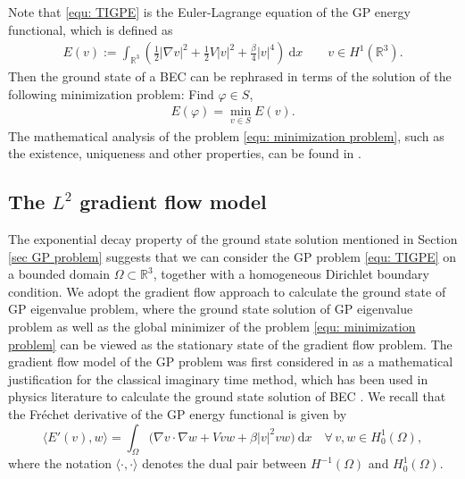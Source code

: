 \documentclass{siamart250211}
\def\R{\mathbb{R}}
\begin{document}
Note that \eqref{equ: TIGPE} is the Euler-Lagrange equation of the GP energy functional, which is defined as
\begin{align}
    E(v):= \int_{\R^3} \left ( \frac12 |\nabla v|^2 + \frac12 V |v|^2 + \frac{\beta}{4} |v|^4  \right ) \ \text{d}x \qquad v \in H^1(\R^3).
\end{align}
Then the ground state of a BEC can be rephrased in terms of the solution of the following minimization problem: Find $\varphi \in S$,
\begin{align}\label{equ: minimization problem}
    E(\varphi) = \min_{v \in S} E(v).
\end{align}
The mathematical analysis of the problem \eqref{equ: minimization problem}, such as the existence, uniqueness and other properties, can be found in \cite{bao2013mathematical,cances2010numerical}.

\subsection{The \texorpdfstring{{\boldmath $L^2$}}{L2} gradient flow model}

The exponential decay property of the ground state solution mentioned in Section \ref{sec GP problem} suggests that we can consider the GP problem \eqref{equ: TIGPE} on a bounded domain $\Omega \subset \R^3$, together with a homogeneous Dirichlet boundary condition. We adopt the gradient flow approach to calculate the ground state of GP eigenvalue problem, where the ground state solution of GP eigenvalue problem as well as the global minimizer of the problem \eqref{equ: minimization problem} can be viewed as the stationary state of the gradient flow problem. The gradient flow model of the GP problem was first considered in \cite{bao2004computing} as a mathematical justification  for the classical imaginary time method, which has been used in physics literature to calculate the ground state solution of BEC \cite{aftalion2001vortices,cerimele2000numerical,chiofalo2000ground}. We recall that the Fr\'echet derivative of the GP energy functional  is given by 
\begin{equation}
	\langle E'(v), w \rangle = \int_{\Omega} \Big(\nabla v \cdot \nabla w + Vvw + \beta |v|^2 vw\Big) \ \text{d}x \quad \forall\, v,w\in H^1_0(\Omega),
\end{equation}
where the notation $\langle \cdot, \cdot \rangle$ denotes the dual pair between $H^{-1}(\Omega)$ and $H_0^1(\Omega)$.
\end{document}
